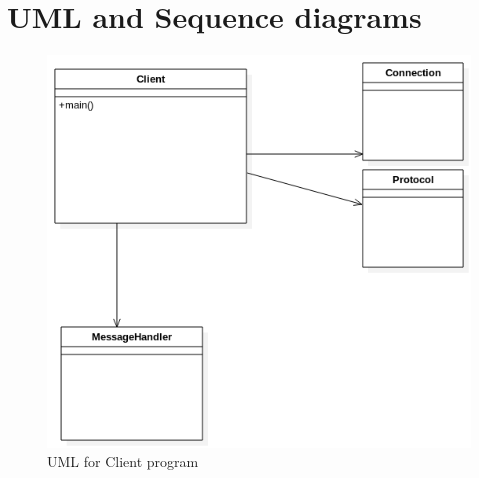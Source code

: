 \documentclass[a4paper]{article}
\begin{document}
\section{UML and Sequence diagrams}
\begin{figure}[h]
    \centering
    \includegraphics[width=\textwidth]{clientUML.png}
    \caption{UML for Client program}
    \label{fig:awesome_image}
\end{figure}
\end{document}
